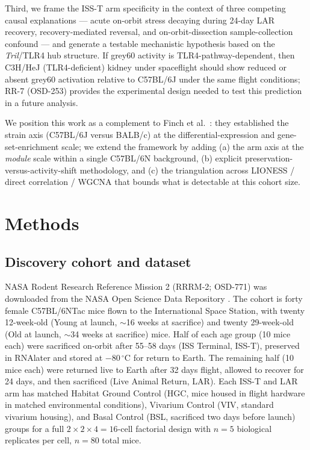 \documentclass[11pt]{article}
\newcommand{\gene}[1]{\textit{#1}}
\begin{document}
Third, we frame the ISS-T arm specificity in the context of three competing causal explanations --- acute on-orbit stress decaying during 24-day LAR recovery, recovery-mediated reversal, and on-orbit-dissection sample-collection confound \citep{galazka2020rnaseq} --- and generate a testable mechanistic hypothesis based on the \gene{Tril}/TLR4 hub structure. If grey60 activity is TLR4-pathway-dependent, then C3H/HeJ (TLR4-deficient) kidney under spaceflight should show reduced or absent grey60 activation relative to C57BL/6J under the same flight conditions; RR-7 (OSD-253) provides the experimental design needed to test this prediction in a future analysis.

We position this work as a complement to Finch et al.\ \citep{finch2025strain}: they established the strain axis (C57BL/6J versus BALB/c) at the differential-expression and gene-set-enrichment scale; we extend the framework by adding (a) the arm axis at the \emph{module} scale within a single C57BL/6N background, (b) explicit preservation-versus-activity-shift methodology, and (c) the triangulation across LIONESS / direct correlation / WGCNA that bounds what is detectable at this cohort size.

\section{Methods}

\subsection{Discovery cohort and dataset}

NASA Rodent Research Reference Mission 2 (RRRM-2; OSD-771) was downloaded from the NASA Open Science Data Repository \citep{ray2019genelab, sanders2024rrrm2}. The cohort is forty female C57BL/6NTac mice flown to the International Space Station, with twenty 12-week-old (Young at launch, $\sim$16 weeks at sacrifice) and twenty 29-week-old (Old at launch, $\sim$34 weeks at sacrifice) mice. Half of each age group (10 mice each) were sacrificed on-orbit after 55--58 days (ISS Terminal, ISS-T), preserved in RNAlater and stored at $-80\,^\circ\mathrm{C}$ for return to Earth. The remaining half (10 mice each) were returned live to Earth after 32 days flight, allowed to recover for 24 days, and then sacrificed (Live Animal Return, LAR). Each ISS-T and LAR arm has matched Habitat Ground Control (HGC, mice housed in flight hardware in matched environmental conditions), Vivarium Control (VIV, standard vivarium housing), and Basal Control (BSL, sacrificed two days before launch) groups for a full $2\times 2\times 4 = 16$-cell factorial design with $n{=}5$ biological replicates per cell, $n{=}80$ total mice.
\end{document}
